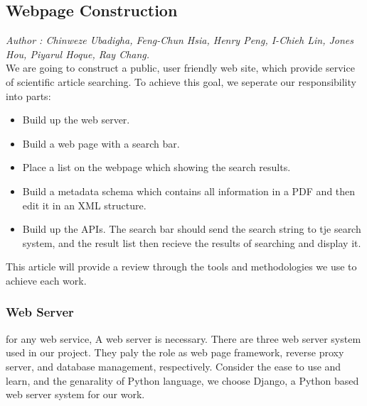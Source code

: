 \subsection{Webpage Construction}
\textit{\footnotesize Author : Chinweze Ubadigha, Feng-Chun Hsia, Henry Peng, I-Chieh Lin, Jones Hou, Piyarul Hoque, Ray Chang.}\\

We are going to construct a public, user friendly web site, which provide service of scientific article searching.
To achieve this goal, we seperate our responsibility into parts:\\
\begin{itemize}
	\item Build up the web server.
	\item Build a web page with a search bar.
	\item Place a list on the webpage which showing the search results.
	\item Build a metadata schema which contains all information in a PDF and then edit it in an XML structure. 
	\item Build up the APIs. The search bar should send the search string to tje search system, and the result list then recieve the results of searching and display it.
\end{itemize}
This article will provide a review through the tools and methodologies we use to achieve each work.
\subsubsection{Web Server}
for any web service, A web server is necessary.
There are three web server system used in our project. 
They paly the role as web page framework, reverse proxy server, 
and database management, respectively.
Consider the ease to use and learn, and the genarality of Python language, 
we choose Django, a Python based web server system for our work.

